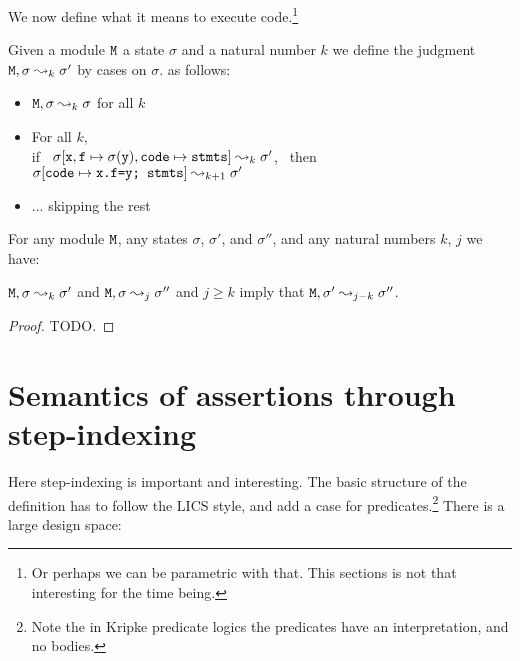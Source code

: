 \documentclass[acmsmall,screen]{acmart}
\begin{document}
We now define what it means to execute code.\footnote{Or perhaps we can be parametric with that.  This sections is not that interesting for the time being.}

\begin{definition}
\label{def:execution:step:index}
Given a module ${\mbox{\tt{M}}}$ a state $\sigma$ and a natural number $k$ we define the judgment ${\mbox{\tt{M}}}, \sigma  \leadsto_k \sigma'$ by cases on $\sigma$. as follows:
\begin{itemize}
\item
${\mbox{\tt{M}}}, \sigma  \leadsto_k \sigma$ for all $k$
\item
For all $k$, \\
 if \  $\sigma[{\mbox{\tt{x}}},{\mbox{\tt{f}}}\mapsto\sigma({\mbox{\tt{y}}}),{\mbox{\tt{code}}}\mapsto {\mbox{\tt{stmts}}}]  \leadsto_k \sigma'$, \ then \
$\sigma[{\mbox{\tt{code}}} \mapsto {\mbox{\tt{x.f=y; stmts}}}] \leadsto_{k+1} \sigma'$
\item
... skipping the rest
\end{itemize}
\end{definition}

\begin{mylemma}
For any module ${\mbox{\tt{M}}}$, any states $\sigma$, $\sigma'$, and $\sigma''$, and any natural numbers $k$, $j$ we have:

\label{lemma:exec:monotinic}
${\mbox{\tt{M}}}, \sigma  \leadsto_k \sigma'$ and ${\mbox{\tt{M}}}, \sigma  \leadsto_j \sigma''$
and $j\geq k$ imply that %
${\mbox{\tt{M}}}, \sigma'  \leadsto_{j-k} \sigma''$.
\end{mylemma}
\begin{proof}
TODO.
\end{proof}

\section{Semantics of assertions through step-indexing}

Here step-indexing is important and interesting.
%
The basic structure of the definition has to follow the LICS style, and add a case for predicates.\footnote{Note the in Kripke predicate logics the predicates have an interpretation, and no bodies.}
There is a large design space:
\end{document}
